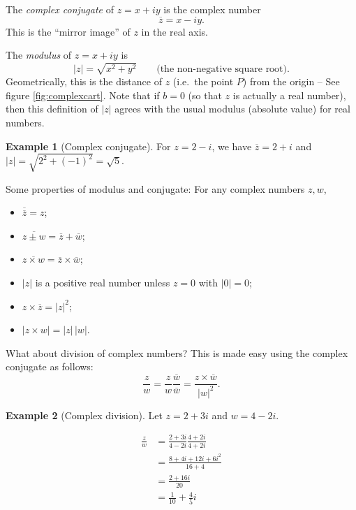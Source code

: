\documentclass[
]{book}
\providecommand{\tightlist}{%
  \setlength{\itemsep}{0pt}\setlength{\parskip}{0pt}}
\theoremstyle{definition}
\theoremstyle{definition}
\newtheorem{example}{Example}[chapter]
\theoremstyle{definition}
\theoremstyle{definition}
\theoremstyle{remark}
\begin{document}
The \emph{complex conjugate} of \(z = x + iy\) is the complex number
\[
\overline{z} = x - iy.
\]
This is the ``mirror image'' of \(z\) in the real axis.

The \emph{modulus} of \(z = x + iy\) is
\[
|z| = \sqrt{x^2 + y^2} \qquad \text{(the non-negative square root).}
\]
Geometrically, this is the distance of \(z\) (i.e.~the point \(P\)) from the origin -- See figure \ref{fig:complexcart}. Note that if \(b = 0\) (so that \(z\) is actually a real number), then this definition of \(|z|\) agrees with the usual modulus (absolute value) for real numbers.

\begin{example}[Complex conjugate]
\protect\hypertarget{exm:conjugate}{}\label{exm:conjugate}For \(z = 2 - i\), we have \(\overline{z} = 2 + i\) and \(|z| = \sqrt{2^2 + (-1)^2} = \sqrt{5}\).
\end{example}

Some properties of modulus and conjugate: For any complex numbers \(z, w\),

\begin{itemize}
\tightlist
\item
  \(\overline{\overline{z}} = z\);
\item
  \(\overline{z \pm w} = \overline{z} + \overline{w}\);
\item
  \(\overline{z\times w} = \overline{z}\times \overline{w}\);
\item
  \(|z|\) is a positive real number unless \(z = 0\) with \(|0| = 0\);
\item
  \(z\times \overline{z} = |z|^2\);
\item
  \(|z\times w| = |z|\,|w|\).
\end{itemize}

What about division of complex numbers? This is made easy using the complex conjugate as follows:
\[\frac{z}{w}=\frac{z}{w}\frac{\overline{w}}{\overline{w}}=\frac{z\times \overline{w}}{|w|^2}.\]

\begin{example}[Complex division]
\protect\hypertarget{exm:complexdiv}{}\label{exm:complexdiv}Let \(z = 2 + 3i\) and \(w = 4 - 2i\).

\begin{align*}
\frac{z}{w}&=\frac{2 + 3i}{4 - 2i}\frac{4+2i}{4+2i}\\
&=\frac{8+4i+12i+6i^2}{16+4}\\
&=\frac{2+16i}{20}\\
&=\frac{1}{10}+\frac{4}{5}i
\end{align*}
\end{example}
\end{document}
